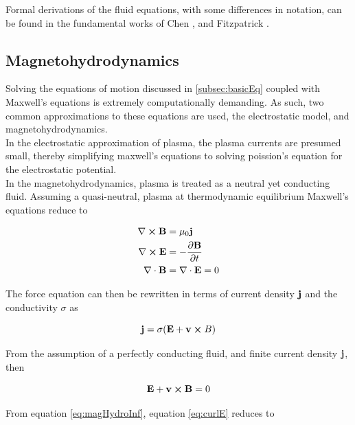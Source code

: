 Formal derivations of the fluid equations, with some differences in notation, can be found in the fundamental works of Chen , and Fitzpatrick .

\subsection{Magnetohydrodynamics}
Solving the equations of motion discussed in \ref{subsec:basicEq} coupled with Maxwell's equations is extremely computationally demanding. As such, two common approximations to these equations are used, the electrostatic model, and magnetohydrodynamics.
\\
In the electrostatic approximation of plasma, the plasma currents are presumed small, thereby simplifying maxwell's equations to solving poission's equation for the electrostatic potential.
\\
In the magnetohydrodynamics, plasma is treated as a neutral yet conducting fluid. Assuming a quasi-neutral, plasma at thermodynamic equilibrium Maxwell's equations reduce to 

\begin{subequations}
    \begin{align}
        \nabla \cross \vb{B} &= \mu_0 \vb{j} \\
        \nabla \cross \vb{E} &= - \pdv{\vb{B}}{t} \label{eq:curlE}\\
        \nabla \cdot \vb{B} &= \nabla \cdot \vb{E} = 0    
    \end{align}
\end{subequations}

The force equation can then be rewritten in terms of current density $\vb{j}$ and the conductivity $\sigma$ as

\begin{equation}\label{eq:maghydroCurr}
    \vb{j} = \sigma (\vb{E} + \vb{v} \cross{B})    
\end{equation}

From the assumption of a perfectly conducting fluid, and finite current density $\vb{j}$, then 

\begin{equation}\label{eq:magHydroInf}
    \vb{E} + \vb{v} \cross \vb{B} = 0
\end{equation}

 From equation \ref{eq:magHydroInf}, equation \ref{eq:curlE} reduces to

